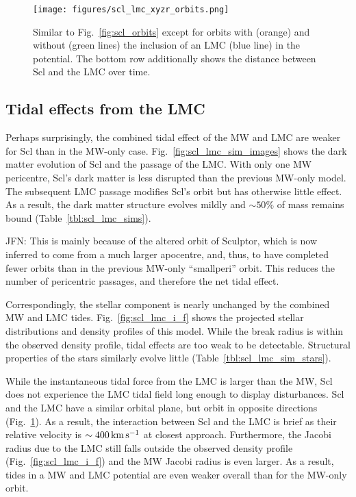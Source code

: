 \begin{figure}
\centering
\texttt{[image: figures/scl\_lmc\_xyzr\_orbits.png]}
\caption[Sculptor orbits with LMC]{Similar to Fig.~\ref{fig:scl_orbits}
except for orbits with (orange) and without (green lines) the inclusion
of an LMC (blue line) in the potential. The bottom row additionally
shows the distance between Scl and the LMC over
time.}\label{fig:scl_lmc_orbits_effect}
\end{figure}

\subsection{Tidal effects from the
LMC}\label{tidal-effects-from-the-lmc}

Perhaps surprisingly, the combined tidal effect of the MW and LMC are
weaker for Scl than in the MW-only case.
Fig.~\ref{fig:scl_lmc_sim_images} shows the dark matter evolution of Scl
and the passage of the LMC. With only one MW pericentre, Scl's dark
matter is less disrupted than the previous MW-only model. The subsequent
LMC passage modifies Scl's orbit but has otherwise little effect. As a
result, the dark matter structure evolves mildly and \(\sim 50\%\) of
mass remains bound (Table~\ref{tbl:scl_lmc_sims}).

JFN: This is mainly because of the altered orbit of Sculptor, which is
now inferred to come from a much larger apocentre, and, thus, to have
completed fewer orbits than in the previous MW-only ``smallperi'' orbit.
This reduces the number of pericentric passages, and therefore the net
tidal effect.

Correspondingly, the stellar component is nearly unchanged by the
combined MW and LMC tides. Fig.~\ref{fig:scl_lmc_i_f} shows the
projected stellar distributions and density profiles of this model.
While the break radius is within the observed density profile, tidal
effects are too weak to be detectable. Structural properties of the
stars similarly evolve little (Table~\ref{tbl:scl_lmc_sim_stars}).

While the instantaneous tidal force from the LMC is larger than the MW,
Scl does not experience the LMC tidal field long enough to display
disturbances. Scl and the LMC have a similar orbital plane, but orbit in
opposite directions (Fig.~\ref{fig:scl_lmc_orbits_effect}). As a result,
the interaction between Scl and the LMC is brief as their relative
velocity is \(\sim 400\,{\rm km\,s^{-1}}\) at closest approach. Furthermore, the
Jacobi radius due to the LMC still falls outside the observed density
profile (Fig.~\ref{fig:scl_lmc_i_f}) and the MW Jacobi radius is even
larger. As a result, tides in a MW and LMC potential are even weaker
overall than for the MW-only orbit.

